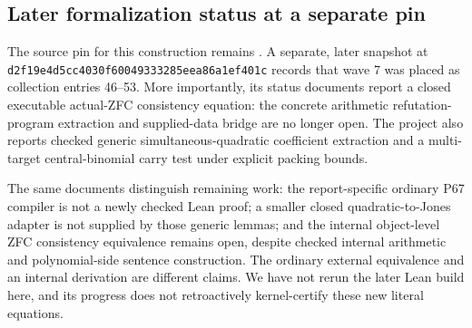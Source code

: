 \subsection{Later formalization status at a separate pin}
The source pin for this construction remains \pin. A separate, later
snapshot at \texttt{d2f19e4d5cc4030f60049333285eea86a1ef401c}
records that wave 7 was placed as collection entries 46--53. More
importantly, its status documents report a closed executable actual-ZFC
consistency equation: the concrete arithmetic refutation-program extraction
and supplied-data bridge are no longer open. The project also reports
checked generic simultaneous-quadratic coefficient extraction and a
multi-target central-binomial carry test under explicit packing bounds.

The same documents distinguish remaining work: the report-specific ordinary
P67 compiler is not a newly checked Lean proof; a smaller closed
quadratic-to-Jones adapter is not supplied by those generic lemmas; and the
internal object-level ZFC consistency equivalence remains open, despite
checked internal arithmetic and polynomial-side sentence construction.
The ordinary external equivalence and an internal derivation are different
claims. We have not rerun the later Lean build here, and its progress does
not retroactively kernel-certify these new literal equations.
